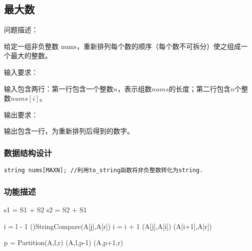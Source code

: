 \subsection{最大数}
\begin{formal}
    {\cuhei 问题描述：}

    给定一组非负整数 nums，重新排列每个数的顺序（每个数不可拆分）使之组成一个最大的整数。
\end{formal}
\begin{formal}
    {\cuhei 输入要求：}

    输入包含两行：第一行包含一个整数$n$，表示组数$nums$的长度；第二行包含$n$个整数$nums[i]$。
\end{formal}
\begin{formal}
    {\cuhei 输出要求：}

    输出包含一行，为重新排列后得到的数字。
\end{formal}
\subsubsection{数据结构设计}
\begin{lstlisting}[name=Q4]
string nums[MAXN]; //利用to_string函数将非负整数转化为string.
\end{lstlisting}
\subsubsection{功能描述}
\begin{function}
    \;
    s1 = S1 + S2\;
    s2 = S2 + S1\;
    {
    }
    \caption{StringCompare($S_1,S_2$)}
\end{function}
\begin{function}[H]
    \;
    \;
    i = l - 1\;
    {
        \If(){StringCompare(A[j],A[r])}
        {
            i = i + 1\;
            \Swap(A[j],A[i])\;
        }
    }
    \Swap(A[i+1],A[r])\;
    \caption{Partition(A,l,r)}
\end{function}
\begin{algorithm}
    {
        p = Partition(A,l,r)\;
        \Quick(A,l,p-1)\;
        \Quick(A,p+1,r)\;
    }
   \caption{Quick-Sort(A,l,r)} 
\end{algorithm}
